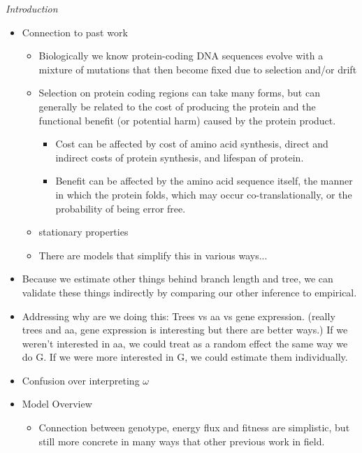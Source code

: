 \documentclass[12pt,letterpaper]{article}
\renewcommand{\subsection}[1]{%
\bigskip
\begin{center}
\begin{large}
\normalfont\itshape #1
\end{large}
\end{center}}
\begin{document}
\subsection{Introduction}
\begin{itemize}
\item Connection to past work
  \begin{itemize}
  \item Biologically we know protein-coding DNA sequences evolve with a mixture of mutations that then become fixed due to selection and/or drift
  \item Selection on protein coding regions can take many forms, but can generally be related to the cost of producing the protein and the functional benefit (or potential harm) caused by the protein product.  
    \begin{itemize}
    \item Cost can be affected by cost of amino acid synthesis, direct and indirect costs of protein synthesis, and lifespan of protein.  
    \item Benefit can be affected by the amino acid sequence itself, the manner in which the protein folds, which may occur co-translationally, or the probability of being error free.
    \end{itemize}
    \item stationary properties
  \item There are models that simplify this in various ways...
  \end{itemize}
\item Because we estimate other things behind branch length and tree, we can validate these things indirectly by comparing our other inference to empirical.
\item Addressing why are we doing this: Trees vs aa vs gene expression. (really trees and aa, gene expression is interesting but there are better ways.)
  If we weren't interested in aa, we could treat as a random effect the same way we do G. If we were more interested in G, we could estimate them individually.
\item Confusion over interpreting $\omega$
\item Model Overview
  \begin{itemize}
  \item Connection between genotype, energy flux and fitness are simplistic, but still more concrete in many ways that other previous work in field.

\end{itemize}
\end{itemize}
\end{document}

